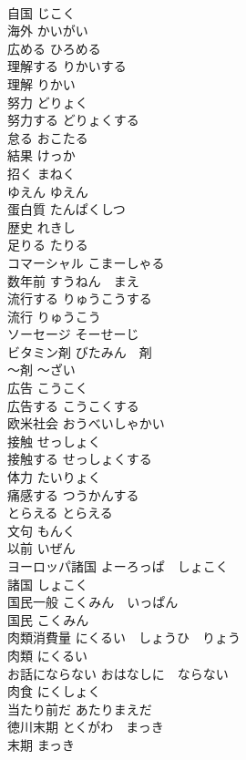 \documentclass[8pt]{extreport}
\begin{document}
\begin{CJK}{UTF8}{min}
\\	自国	じこく	
\\	海外	かいがい	
\\	広める	ひろめる	
\\	理解する	りかいする	
\\	理解	りかい	
\\	努力	どりょく	
\\	努力する	どりょくする	
\\	怠る	おこたる	
\\	結果	けっか	
\\	招く	まねく	
\\	ゆえん	ゆえん	
\\	蛋白質	たんぱくしつ	
\\	歴史	れきし	
\\	足りる	たりる	
\\	コマーシャル	こまーしゃる	
\\	数年前	すうねん　まえ	
\\	流行する	りゅうこうする	
\\	流行	りゅうこう	
\\	ソーセージ	そーせーじ	
\\	ビタミン剤	びたみん　剤	
\\	〜剤	〜ざい	
\\	広告	こうこく	
\\	広告する	こうこくする	
\\	欧米社会	おうべいしゃかい	
\\	接触	せっしょく	
\\	接触する	せっしょくする	
\\	体力	たいりょく	
\\	痛感する	つうかんする	
\\	とらえる	とらえる	
\\	文句	もんく	
\\	以前	いぜん	
\\	ヨーロッパ諸国	よーろっぱ　しょこく	
\\	諸国	しょこく	
\\	国民一般	こくみん　いっぱん	
\\	国民	こくみん	
\\	肉類消費量	にくるい　しょうひ　りょう	
\\	肉類	にくるい	
\\	お話にならない	おはなしに　ならない	
\\	肉食	にくしょく	
\\	当たり前だ	あたりまえだ	
\\	徳川末期	とくがわ　まっき	
\\	末期	まっき	

\end{CJK}
\end{document}
